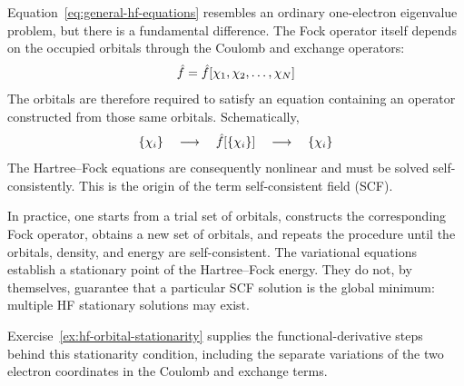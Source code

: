 \documentclass[11pt,a4paper,titlepage]{article}
\numberwithin{equation}{section}
\newcommand{\hf}{\Hat{f}}
\begin{document}
Equation~\eqref{eq:general-hf-equations} resembles an ordinary one-electron
eigenvalue problem, but there is a fundamental difference. The Fock
operator itself depends on the occupied orbitals through the Coulomb and
exchange operators:
\begin{equation}
  \hf
  =
  \hf[\chi_1,\chi_2,\ldots,\chi_N]
\end{equation}
The orbitals are therefore required to satisfy an equation containing an
operator constructed from those same orbitals.
Schematically,
\begin{equation}
  \{\chi_i\}
  \quad\longrightarrow\quad
  \hf[\{\chi_i\}]
  \quad\longrightarrow\quad
  \{\chi_i\}
\end{equation}
The Hartree--Fock equations are consequently nonlinear and must be
solved self-consistently. This is the origin of the term
self-consistent field (SCF).

In practice, one starts from a trial set of orbitals, constructs the
corresponding Fock operator, obtains a new set of orbitals, and repeats the
procedure until the orbitals, density, and energy are self-consistent.
The variational equations establish a stationary point of the Hartree--Fock energy.
They do not, by themselves, guarantee that a particular SCF solution is the
global minimum: multiple HF stationary solutions may exist.

Exercise~\ref{ex:hf-orbital-stationarity} supplies the functional-derivative steps behind this
stationarity condition, including the separate variations of the two
electron coordinates in the Coulomb and exchange terms.
\end{document}
